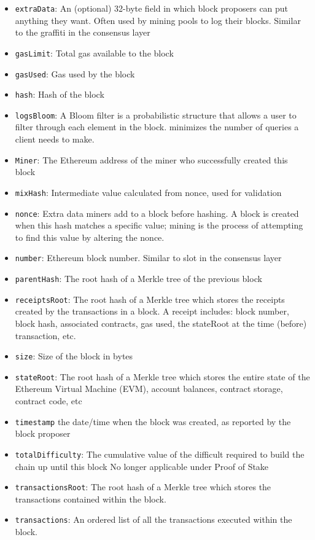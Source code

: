 \documentclass[fleqn,10pt]{olplainarticle}
\begin{document}
\begin{itemize}[noitemsep]
	\item \texttt{extraData}: An (optional) 32-byte field in which block proposers can put anything they want. Often used by mining pools to log their blocks.
	Similar to the graffiti in the consensus layer
	\item \texttt{gasLimit}: Total gas available to the block
	\item \texttt{gasUsed}: Gas used by the block
	\item \texttt{hash}: Hash of the block
	\item \texttt{logsBloom}: A Bloom filter is a probabilistic structure that allows a user to filter through each element in the block.
	minimizes the number of queries a client needs to make.
	\item \texttt{Miner}: The Ethereum address of the miner who successfully created this block
	\item \texttt{mixHash}: Intermediate value calculated from nonce, used for validation
	\item \texttt{nonce}: Extra data miners add to a block before hashing. A block is created when this hash matches a specific value; mining is the process of attempting to find this value by altering the nonce.
	\item \texttt{number}: Ethereum block number. Similar to slot in the consensus layer
	\item \texttt{parentHash}: The root hash of a Merkle tree of the previous block
	\item \texttt{receiptsRoot}: The root hash of a Merkle tree which stores the receipts created by the transactions in a block. A receipt includes: block number, block hash, associated contracts, gas used, the stateRoot at the time (before) transaction, etc.
	\item \texttt{size}: Size of the block in bytes
	\item \texttt{stateRoot}: The root hash of a Merkle tree which stores the entire state of the Ethereum Virtual Machine (EVM), account balances, contract storage, contract code, etc
	\item \texttt{timestamp} the date/time when the block was created, as reported by the block proposer
	\item \texttt{totalDifficulty}: The cumulative value of the difficult required to build the chain up until this block
	No longer applicable under Proof of Stake
	\item \texttt{transactionsRoot}: The root hash of a Merkle tree which stores the transactions contained within the block.
	\item \texttt{transactions}: An ordered list of all the transactions executed within the block.
\end{itemize}
\end{document}
